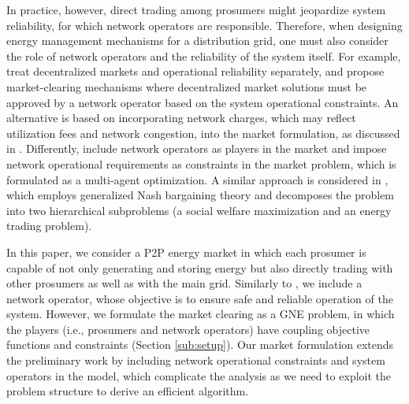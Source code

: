 \documentclass{IEEEtran}  %
\newcommand{\0}{\mathbf{0}}
\newcommand{\1}{\mathbf{1}}
\begin{document}
In practice, however, direct trading among prosumers might jeopardize system reliability, for which network operators are responsible. Therefore, when designing energy management mechanisms for a distribution grid, one must also consider the role of network operators and the reliability of the system itself.
%
For example, \cite{qin2018,morstyn2019} treat decentralized markets and operational reliability separately, and propose market-clearing mechanisms where decentralized market solutions must be approved by a network operator based on the system operational constraints. 
%
An alternative is based on incorporating network charges, which may reflect utilization fees and network congestion, into the market formulation, as discussed in \cite{baroche2019b,paudel2020}. Differently, \cite{moret2020,zhang2020} include network operators as players in the market and impose network operational requirements as constraints in the market problem, which is formulated as a multi-agent optimization. {A similar approach is considered in \cite{zhong2020cooperative}, which employs generalized Nash bargaining theory and decomposes the problem into two hierarchical subproblems (a social welfare maximization and an energy trading problem).} 

In this paper, we consider a P2P energy market in which each prosumer is capable of not only generating and storing energy but also directly trading with other prosumers as well as with the main grid. Similarly to \cite{moret2020}, we include a network operator, whose objective is to ensure safe and reliable operation  of the system. 
%
However, we formulate the market clearing as a GNE problem, in which the players (i.e., prosumers and network operators) have coupling objective functions and constraints (Section \ref{sub:setup}). {Our market formulation extends the preliminary work \cite{belgioioso2020energy} by including network operational constraints and system operators in the model, which complicate the analysis as we need to exploit the problem structure to derive an efficient algorithm.}
\end{document}

